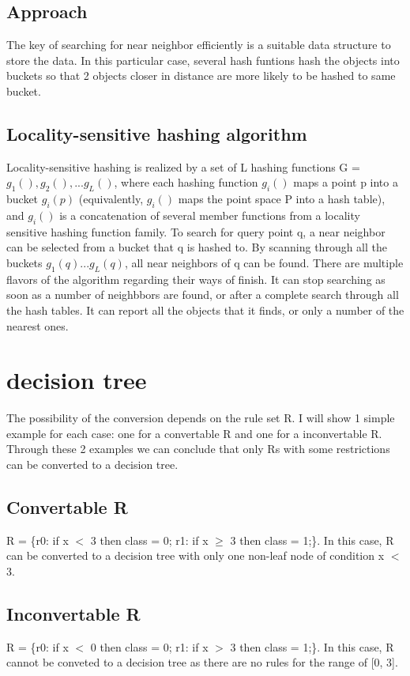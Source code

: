 \documentclass[12pt]{article}
\begin{document}
\begin{multicols}{2}
  \subsection{Approach}
  The key of searching for near neighbor efficiently is a suitable data structure to store the data. In this particular case, several hash funtions hash the objects into buckets so that 2 objects closer in distance are more likely to be hashed to same bucket. 
  \subsection{Locality-sensitive hashing algorithm}
  Locality-sensitive hashing is realized by a set of L hashing functions G = {$g_1(), g_2(),...g_L()$}, where each hashing function $g_i()$ maps a point p into a bucket $g_i(p)$ (equivalently, $g_i()$ maps the point space P into a hash table), and $g_i()$ is a concatenation of several member functions from a locality sensitive hashing function family. To search for query point q, a near neighbor can be selected from a bucket that q is hashed to. By scanning through all the buckets $g_1(q)...g_L(q)$, all near neighbors of q can be found. There are multiple flavors of the algorithm regarding their ways of finish. It can stop searching as soon as a number of neighbbors are found, or after a complete search through all the hash tables. It can report all the objects that it finds, or only a number of the nearest ones.
  \section{decision tree}
  The possibility of the conversion depends on the rule set R. I will show 1 simple example for each case: one for a convertable R and one for a inconvertable R. Through these 2 examples we can conclude that only Rs with some restrictions can be converted to a decision tree.
  \subsection{Convertable R}
  R = \{r0: if x $<$ 3 then class = 0; r1: if x $\geq$ 3 then class = 1;\}. In this case, R can be converted to a decision tree with only one non-leaf node of condition x $<$ 3.
  \subsection{Inconvertable R}
  R = \{r0: if x $<$ 0 then class = 0; r1: if x $>$ 3 then class = 1;\}. In this case, R cannot be conveted to a decision tree as there are no rules for the range of [0, 3].

\end{multicols}
\end{document}
